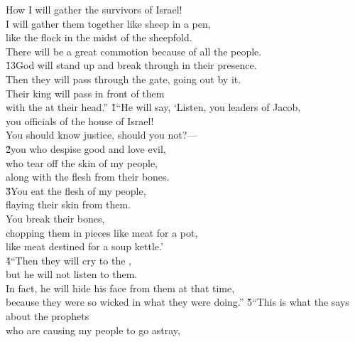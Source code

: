 \begin{poetry}
\poemll    How I will gather the survivors of Israel! \\
\poeml I will gather them together like sheep in a pen, \\
\poemll    like the flock in the midst of the sheepfold. \\
\poemlll       There will be a great commotion because of all the people. \\
\poeml \v{13}God will stand up and break through in their presence. \\
\poemll    Then they will pass through the gate, going out by it. \\
\poeml Their king will pass in front of them \\
\poemll    with the  at their head.''
\poeml {}
\v{1}``He will say, `Listen, you leaders of Jacob, \\
\poeml you officials of the house of Israel! \\
\poeml You should know justice, should you not?--- \\
\poeml \v{2}you who despise good and love evil, \\
\poemll    who tear off the skin of my people, \\
\poemlll       along with the flesh from their bones. \\
\poeml \v{3}You eat the flesh of my people, \\
\poemll    flaying their skin from them. \\
\poeml You break their bones, \\
\poemll    chopping them in pieces like meat for a pot, \\
\poemlll       like meat destined for a soup kettle.' \\
\poeml \v{4}``Then they will cry to the , \\
\poemll    but he will not listen to them. \\
\poeml In fact, he will hide his face from them at that time, \\
\poemll    because they were so wicked in what they were doing.''
\poeml \v{5}``This is what the  says about the prophets \\
\poemll    who are causing my people to go astray, \\

\end{poetry}
